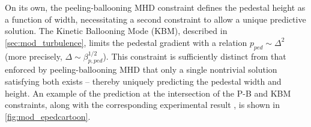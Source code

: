 On its own, the peeling-ballooning MHD constraint defines the pedestal height as a function of width, necessitating a second constraint to allow a unique predictive solution.  The Kinetic Ballooning Mode (KBM), described in \cref{sec:mod_turbulence}, limits the pedestal gradient with a relation $p_{ped} \sim \Delta^2$ (more precisely, $\Delta \sim \beta_{p,ped}^{1/2}$).  This constraint is sufficiently distinct from that enforced by peeling-ballooning MHD  that only a single nontrivial solution satisfying both exists -- thereby uniquely predicting the pedestal width and height.  An example of the prediction at the intersection of the P-B and KBM constraints, along with the corresponding experimental result \cite{Snyder2011}, is shown in \cref{fig:mod_epedcartoon}.

\begin{figure}[ht]
 \pushtooutside
\end{figure}

